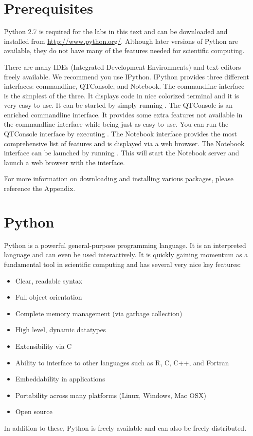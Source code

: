 \label{lab:Essential_Python}

\section*{Prerequisites}
Python 2.7 is required for the labs in this text and can be downloaded and 
installed from \url{http://www.python.org/}. Although later versions of 
Python are available, they do not have many of the features needed for scientific computing. 

There are many IDEs (Integrated Development Environments) and text editors freely 
available. We recommend you use IPython.
IPython provides three different interfaces: commandline, QTConsole, and Notebook.
The commandline interface is the simplest of the three.
It displays code in nice colorized terminal and it is very easy to use.
It can be started by simply running .
The QTConsole is an enriched commandline interface.
It provides some extra features not available in the commandline interface while being just as easy to use.
You can run the QTConsole interface by executing .
The Notebook interface provides the most comprehensive list of features and is displayed via a web browser.
The Notebook interface can be launched by running .
This will start the Notebook server and launch a web browser with the interface.

For more information on downloading and installing various packages, please 
reference the Appendix. 


\section*{Python}
Python is a powerful general-purpose programming language. It is an interpreted
language and can even be used interactively. 
It is quickly gaining momentum as a fundamental tool in scientific computing and has several 
very nice key features:
\begin{itemize}
\item Clear, readable syntax
\item Full object orientation
\item Complete memory management (via garbage collection)
\item High level, dynamic datatypes
\item Extensibility via C
\item Ability to interface to other languages such as R, C, C++, and Fortran
\item Embeddability in applications
\item Portability across many platforms (Linux, Windows, Mac OSX)
\item Open source
\end{itemize}
In addition to these, Python is freely available and can also be freely distributed.

